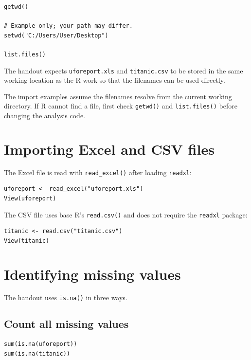 \begin{lstlisting}[style=dsr]
getwd()

# Example only; your path may differ.
setwd("C:/Users/User/Desktop")

list.files()
\end{lstlisting}

The handout expects \texttt{uforeport.xls} and \texttt{titanic.csv} to be stored in the same working location as the R work so that the filenames can be used directly.

\begin{keyidea}
The import examples assume the filenames resolve from the current working directory. If R cannot find a file, first check \texttt{getwd()} and \texttt{list.files()} before changing the analysis code.
\end{keyidea}

\section{Importing Excel and CSV files}

The Excel file is read with \texttt{read\_excel()} after loading \texttt{readxl}:

\begin{lstlisting}[style=dsr]
uforeport <- read_excel("uforeport.xls")
View(uforeport)
\end{lstlisting}

The CSV file uses base R's \texttt{read.csv()} and does not require the \texttt{readxl} package:

\begin{lstlisting}[style=dsr]
titanic <- read.csv("titanic.csv")
View(titanic)
\end{lstlisting}

\section{Identifying missing values}

The handout uses \texttt{is.na()} in three ways.

\subsection{Count all missing values}

\begin{lstlisting}[style=dsr]
sum(is.na(uforeport))
sum(is.na(titanic))
\end{lstlisting}

